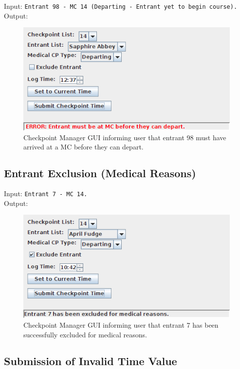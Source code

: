 \documentclass[a4paper, 10pt]{article}
\begin{document}
Input: \verb+Entrant 98 - MC 14 (Departing - Entrant yet to begin course).+ \\

Output:
\begin{figure}[ht!]
\centering
\includegraphics[scale=0.7]{cm-mcdepartfailure.png}
\caption{Checkpoint Manager GUI informing user that entrant 98 must have arrived at a MC before they can depart.}
\end{figure}

\subsection{Entrant Exclusion (Medical Reasons)}

Input: \verb+Entrant 7 - MC 14.+ \\

Output:
\begin{figure}[ht!]
\centering
\includegraphics[scale=0.7]{cm-mcexclude.png}
\caption{Checkpoint Manager GUI informing user that entrant 7 has been successfully excluded for medical reasons.}
\end{figure}

\clearpage
\subsection{Submission of Invalid Time Value}
\end{document}
